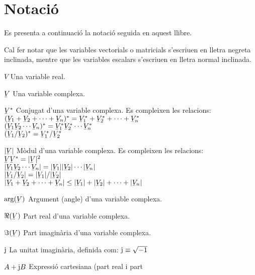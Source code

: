 \chapter*{Notaci\'{o}} 

Es presenta a continuaci\'{o} la notaci\'{o} seguida en aquest llibre.

Cal fer notar que les variables vectorials o matricials s'escriuen
en lletra negreta inclinada,  mentre que les variables escalars
s'escriuen en lletra normal inclinada.

\begin{list}{}
{\setlength{\labelwidth}{15mm} \setlength{\leftmargin}{25mm}
\setlength{\labelsep}{10mm}}
    \item[$V$] Una variable real.
    \item[$\cmplx{V}$] Una variable complexa.
    \item[$\cmplx{V}^*$] Conjugat d'una variable complexa.
    Es compleixen les relacions:\\[1ex]
     $(\cmplx{V}_1+\cmplx{V}_2+\cdots+\cmplx{V}_n)^* = \cmplx{V}_1^* +
    \cmplx{V}_2^*+\cdots+\cmplx{V}_n^*$\\[1ex]
    $(\cmplx{V}_1 \cmplx{V}_2 \cdots \cmplx{V}_n)^* = \cmplx{V}_1^*  \cmplx{V}_2^*
    \cdots \cmplx{V}_n^*$\\[1ex]
    $(\cmplx{V}_1 / \cmplx{V}_2)^* = \cmplx{V}_1^* / \cmplx{V}_2^*$
    \item[$|\cmplx{V}|$] M\`{o}dul d'una variable complexa.
    Es compleixen les relacions:\\[1ex]
      $\cmplx{V}\cmplx{V}^* = |\cmplx{V}|^2$\\[1ex]
      $|\cmplx{V}_1 \cmplx{V}_2 \cdots \cmplx{V}_n| =
       |\cmplx{V}_1| |\cmplx{V}_2| \cdots |\cmplx{V}_n|$\\[1ex]
       $|\cmplx{V}_1 / \cmplx{V}_2| = |\cmplx{V}_1| / |\cmplx{V}_2|$\\[1ex]
      $|\cmplx{V}_1+\cmplx{V}_2+\cdots+\cmplx{V}_n| \leq
      |\cmplx{V}_1| + |\cmplx{V}_2| + \cdots  +|\cmplx{V}_n|$
    \item[$\arg(\cmplx{V})$] Argument (angle) d'una variable complexa.
    \item[$\Re(\cmplx{V})$] Part real d'una variable complexa.
    \item[$\Im(\cmplx{V})$] Part imagin\`{a}ria d'una variable complexa.
    \item[$\mathrm{j}$] La unitat imagin\`{a}ria, definida com:
    $\mathrm{j}\equiv\sqrt{-1}$
    \item[$A+\mathrm{j} B$] Expressi\'{o} cartesiana (part real i part

\end{list}
